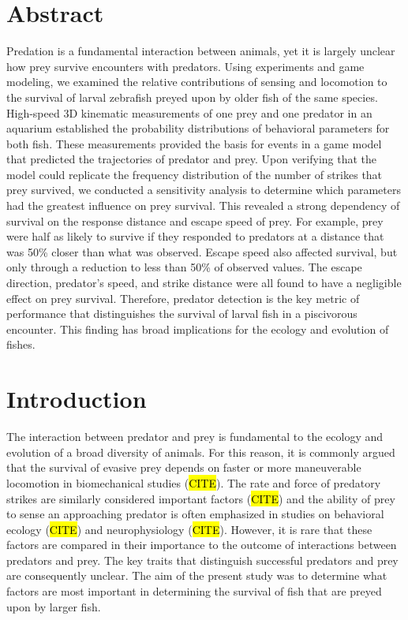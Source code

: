 \documentclass[]{rsos}%
\begin{document}
\section*{Abstract}
Predation is a fundamental interaction between animals, yet it is largely unclear how prey survive encounters with predators.
Using experiments and game modeling, we examined the relative contributions of sensing and locomotion to the survival of larval zebrafish preyed upon by older fish of the same species.
High-speed 3D kinematic measurements of one prey and one predator in an aquarium established the probability distributions of behavioral parameters for both fish.
These measurements provided the basis for events in a game model that predicted the trajectories of predator and prey. 
Upon verifying that the model could replicate the frequency distribution of the number of strikes that prey survived, we conducted a sensitivity analysis to determine which parameters had the greatest influence on prey survival.
This revealed a strong dependency of survival on the response distance and escape speed of prey. 
For example, prey were half as likely to survive if they responded to predators at a distance that was 50\% closer than what was observed.
Escape speed also affected survival, but only through a reduction to less than 50\% of observed values.
The escape direction, predator's speed, and strike distance were all found to have a negligible effect on prey survival. 
Therefore, predator detection is the key metric of performance that distinguishes the survival of larval fish in a piscivorous encounter.
This finding has broad implications for the ecology and evolution of fishes.



\section{Introduction}

The interaction between predator and prey is fundamental to the ecology and evolution of a broad diversity of animals.
For this reason, it is commonly argued that the survival of evasive prey depends on faster or more maneuverable locomotion in biomechanical studies (\hl{CITE}).
The rate and force of predatory strikes are similarly considered important factors (\hl{CITE}) and the ability of prey to sense an approaching predator is often emphasized in studies on behavioral ecology (\hl{CITE}) and neurophysiology (\hl{CITE}).
However, it is rare that these factors are compared in their importance to the outcome of interactions between predators and prey. 
The key traits that distinguish successful predators and prey are consequently unclear. 
The aim of the present study was to determine what factors are most important in determining the survival of fish that are preyed upon by larger fish.
\end{document}

